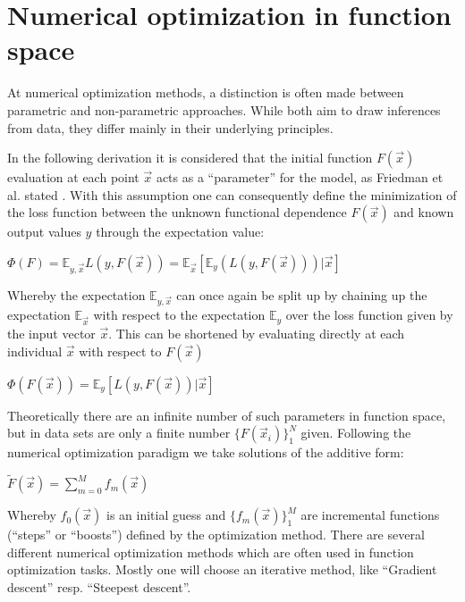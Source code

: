 \documentclass[12pt, a4paper]{article}
\begin{document}
\section{Numerical optimization in function space}
\label{sec: parameter_opt}
At numerical optimization methods, a distinction is often made between parametric and non-parametric approaches. While both aim to draw inferences from data, they differ mainly in their underlying principles.

In the following derivation it is considered that the initial function $F(\vec{x})$ evaluation at each point $\vec{x}$ acts as a ``parameter'' for the model, as Friedman et al. stated \cite{Friedman2001}. With this assumption one can consequently define the minimization of the loss function between the unknown functional dependence $F(\vec{x})$ and known output values $y$ through the expectation value:
\begin{center}
    $\Phi(F) = \mathbb{E}_{y,\vec{x}} L(y,F(\vec{x})) = \mathbb{E}_{\vec{x}}[\mathbb{E}_y(L(y,F(\vec{x})))|\vec{x}]$
\end{center}
Whereby the expectation $\mathbb{E}_{y,\vec{x}}$ can once again be split up by chaining up the expectation $\mathbb{E}_{\vec{x}}$ with respect to the expectation $\mathbb{E}_y$ over the loss function given by the input vector $\vec{x}$. This can be shortened by evaluating directly at each individual $\vec{x}$ with respect to $F(\vec{x})$
\begin{center}
    $\Phi(F(\vec{x})) = \mathbb{E}_y [L(y,F(\vec{x}))|\vec{x}]$
\end{center}
Theoretically there are an infinite number of such parameters in function space, but in data sets are only a finite number $\{F(\vec{x}_i)\}_1^N$ given. Following the numerical optimization paradigm we take solutions of the additive form:
\begin{center}
    $\tilde{F}(\vec{x}) = \sum_{m=0}^{M} f_m(\vec{x})$
\end{center}
Whereby $f_0(\vec{x})$ is an initial guess and $\{f_m(\vec{x})\}_1^M$ are incremental functions (``steps'' or ``boosts'') defined by the optimization method. There are several different numerical optimization methods which are often used in function optimization tasks. Mostly one will choose an iterative method, like ``Gradient descent'' resp. ``Steepest descent''. \\
\end{document}
